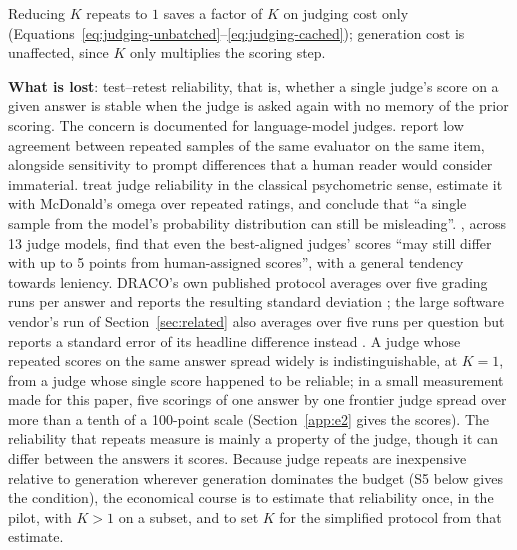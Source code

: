 \documentclass[11pt]{article}
\begin{document}
Reducing $K$ repeats to $1$ saves a factor of $K$ on judging cost only (Equations~\ref{eq:judging-unbatched}--\ref{eq:judging-cached}); generation cost is unaffected, since
$K$ only multiplies the scoring step.

\textbf{What is lost}: test--retest reliability, that is, whether a single judge's score on a given answer is stable when the judge is asked again with no memory of the prior scoring. The concern is documented for language-model judges. \citet{stureborg2024inconsistent} report low agreement between repeated samples of
the same evaluator on the same item, alongside sensitivity to prompt differences that a
human reader would consider immaterial. \citet{schroeder2024reliability} treat judge
reliability in the classical psychometric sense, estimate it with McDonald's omega over
repeated ratings, and conclude that ``a single sample from the model's probability
distribution can still be misleading''. \citet{thakur2025judging}, across 13 judge
models, find that even the best-aligned judges' scores ``may still differ with up to 5
points from human-assigned scores'', with a general tendency towards leniency. DRACO's own
published protocol averages over five grading runs per answer and reports the resulting
standard deviation \citep{draco2026}; the large software vendor's run of Section~\ref{sec:related} also averages over five runs per question but reports a standard error of its headline difference instead
\citep{msftdraco2026}. A judge whose repeated scores on the same answer spread widely is
indistinguishable, at $K = 1$, from a judge whose single score happened to be reliable;
in a small measurement made for this paper, five scorings of one answer by one frontier
judge spread over more than a tenth of a 100-point scale (Section~\ref{app:e2} gives the scores).
The reliability that repeats measure is mainly a property of the judge, though it can differ between the answers it scores. Because judge repeats are inexpensive relative to generation wherever generation dominates the budget (S5 below gives the condition), the economical course is to estimate that reliability once, in the pilot, with $K > 1$ on a subset, and to set $K$ for the simplified protocol from that estimate.
\end{document}
